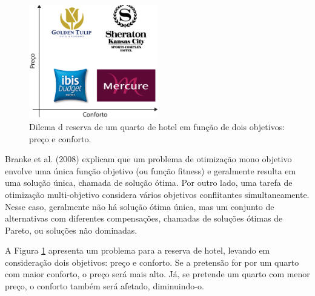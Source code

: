 \begin{figure}[htb]
    \centering
    \includegraphics[width=0.5\textwidth]{imagens/hotel-multi.eps}
    \caption{Dilema d reserva de um quarto de hotel em função de dois objetivos: preço e conforto.} \label{fig:hotel-multi}
\end{figure}

Branke et al. (2008) \cite{branke2008multiobjective} explicam que um problema de otimização mono objetivo envolve uma única função objetivo (ou função fitness) e geralmente resulta em uma solução única, chamada de solução ótima. Por outro lado, uma tarefa de otimização multi-objetivo considera vários objetivos conflitantes simultaneamente. Nesse caso, geralmente não há solução ótima única, mas um conjunto de alternativas com diferentes compensações, chamadas de soluções ótimas de Pareto, ou soluções não dominadas.

A Figura \ref{fig:hotel-multi} apresenta um problema para a reserva de hotel, levando em consideração dois objetivos: preço e conforto. Se a pretensão for por um quarto com maior conforto, o preço será mais alto. Já, se pretende um quarto com menor preço, o conforto também será afetado, diminuindo-o.

